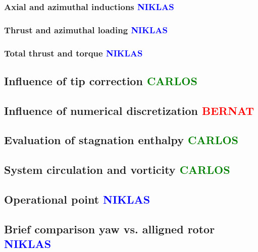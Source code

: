 \subsubsection{Axial and azimuthal inductions \textcolor{blue}{NIKLAS}}

\subsubsection{Thrust and azimuthal loading \textcolor{blue}{NIKLAS}}

\subsubsection{Total thrust and torque \textcolor{blue}{NIKLAS}}

\subsection{Influence of tip correction \textcolor{green}{CARLOS}}

\subsection{Influence of numerical discretization \textcolor{red}{BERNAT}}

\subsection{Evaluation of stagnation enthalpy \textcolor{green}{CARLOS}}

\subsection{System circulation and vorticity \textcolor{green}{CARLOS}}

\subsection{Operational point \textcolor{blue}{NIKLAS}}

\subsection{Brief comparison yaw vs. alligned rotor \textcolor{blue}{NIKLAS}}



